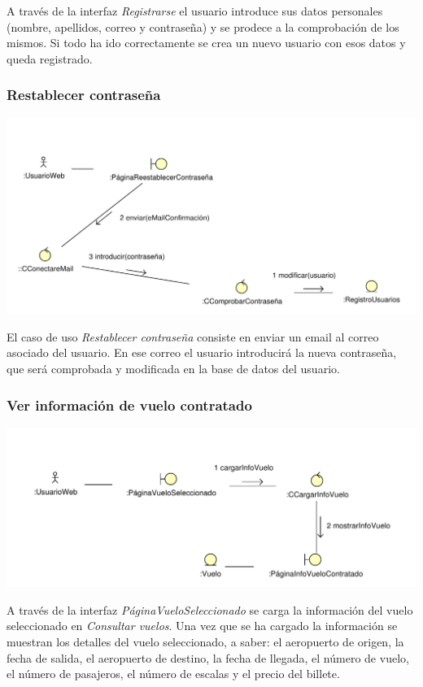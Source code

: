 \documentclass[11pt, a4paper, twoside, titlepage]{article}
\begin{document}
					A través de la interfaz {\itshape Registrarse} el usuario introduce sus datos personales (nombre, apellidos, correo y contraseña) y se prodece a la comprobación de los mismos. Si todo ha ido correctamente se crea un nuevo usuario con esos datos y queda registrado.

			\subsubsection{Restablecer contraseña}
				\begin{center}
					\includegraphics[scale=.77]{analisis/diagramas/restablecercontrasena.pdf}
				\end{center}


					El caso de uso {\itshape Restablecer contraseña} consiste en enviar un email  al correo asociado del usuario. En ese correo el usuario introducirá la nueva contraseña, que será comprobada y modificada en la base de datos del usuario.
			\subsubsection{Ver información de vuelo contratado}
				\begin{center}
					\includegraphics[scale=.8]{analisis/diagramas/verinfovuelocontratado.pdf}
				\end{center}

					A través de la interfaz {\itshape PáginaVueloSeleccionado} se carga la información del vuelo seleccionado en  {\itshape Consultar vuelos}. Una vez que se ha cargado la información se muestran los detalles del vuelo seleccionado, a saber: el aeropuerto de origen, la fecha de salida, el aeropuerto de destino, la fecha de llegada, el número de vuelo, el número de pasajeros, el número de escalas y el precio del billete.
\end{document}
